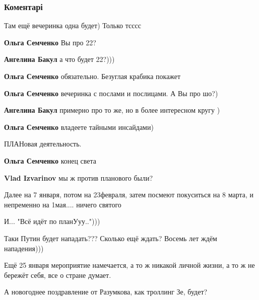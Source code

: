  
 
 
 
 
\subsubsection{Коментарі}

\begin{itemize} %
Там ещё вечеринка одна будет)
Только тсссс

\begin{itemize} %
\textbf{Ольга Семченко} Вы про 22?

\textbf{Ангелина Бакул} а что будет 22?)))


\textbf{Ольга Семченко} обязательно. Безуглая крабика покажет

\textbf{Ольга Семченко} вечеринка с послами и послицами. А Вы про шо?)

\textbf{Ангелина Бакул} примерно про то же, но в более интересном кругу )

\textbf{Ольга Семченко} владеете тайными инсайдами)

ПЛАНовая деятельность.

\textbf{Ольга Семченко} конец света

\textbf{Vlad Izvarinov} мы ж против планового были?
\end{itemize} %

Далее на 7 января, потом на 23февраля, затем посмеют покуситься на 8 марта, и непременно на 1мая.... ничего святого

И... "Всё идёт по планУуу..")))

Таки Путин будет нападать??? Сколько ещё ждать? Восемь лет ждём нападения)))

Ещё 25 января мероприятие намечается, а то ж никакой личной жизни, а то ж не бережёт себя, все о стране думает.

А новогоднее поздравление от Разумкова, как троллинг Зе, будет?


\end{itemize}
